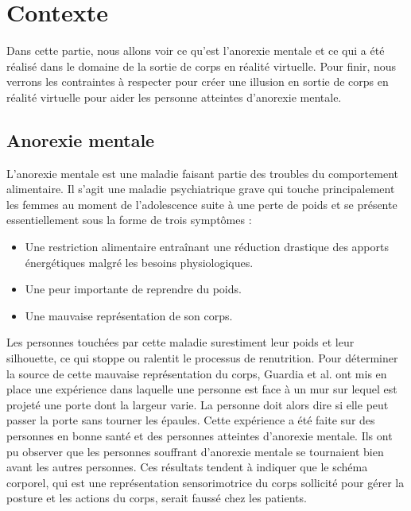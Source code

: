 \section{Contexte}

Dans cette partie, nous allons voir ce qu'est l'anorexie mentale et ce qui a été réalisé dans le domaine de la sortie de corps en réalité virtuelle. Pour finir, nous verrons les contraintes à respecter pour créer une illusion en sortie de corps en réalité virtuelle pour aider les personne atteintes d'anorexie mentale.
\subsection{Anorexie mentale}

L'anorexie mentale est une maladie faisant partie des troubles du comportement alimentaire. Il s'agit une maladie psychiatrique grave qui touche principalement les femmes au moment de l'adolescence suite à une perte de poids et se présente essentiellement sous la forme de trois symptômes :
\begin{itemize}
\item Une restriction alimentaire entraînant une réduction drastique des apports énergétiques malgré les besoins physiologiques.
\item Une peur importante de reprendre du poids.
\item Une mauvaise représentation de son corps.
\end{itemize}

Les personnes touchées par cette maladie surestiment leur poids et leur silhouette, ce qui stoppe ou ralentit le processus de renutrition. Pour déterminer la source de cette mauvaise représentation du corps, Guardia et al. \cite{gu10} ont mis en place une expérience dans laquelle une personne est face à un mur sur lequel est projeté une porte dont la largeur varie. La personne doit alors dire si elle peut passer la porte sans tourner les épaules. Cette expérience a été faite sur des personnes en bonne santé et des personnes atteintes d'anorexie mentale. Ils ont pu observer que les personnes souffrant d'anorexie mentale se tournaient bien avant les autres personnes. Ces résultats tendent à indiquer que le schéma corporel, qui est une représentation sensorimotrice du corps sollicité pour gérer la posture et les actions du corps, serait faussé chez les patients.\\

